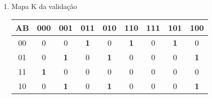 \documentclass[12pt]{article}
\begin{document}
\begin{enumerate}
	\item Mapa K da validação
	
	\begin{tabular}{|c|c|c|c|c|c|c|c|c|}
	\hline
	
	AB & 000 & 001 & 011 & 010 & 110 & 111 & 101 & 100 \\ \hline
	00 &  0  &  0  &  \textbf{1}  &  0  &  \textbf{1}  &  0  &  \textbf{1}  &  0  \\ \hline
	01 &  0  &  \textbf{1}  &  0  &  \textbf{1}  &  0  &  0  &  0  &  \textbf{1}  \\ \hline
	11 &  \textbf{1}  &  0  &  0  &  0  &  0  &  0  &  0  &  0  \\ \hline
	10 &	  0  &  \textbf{1}  &  0  &  \textbf{1}  &  0  &  0  &  0  &  \textbf{1}  \\ \hline
	
	\end{tabular}
\end{enumerate}
\end{document}
